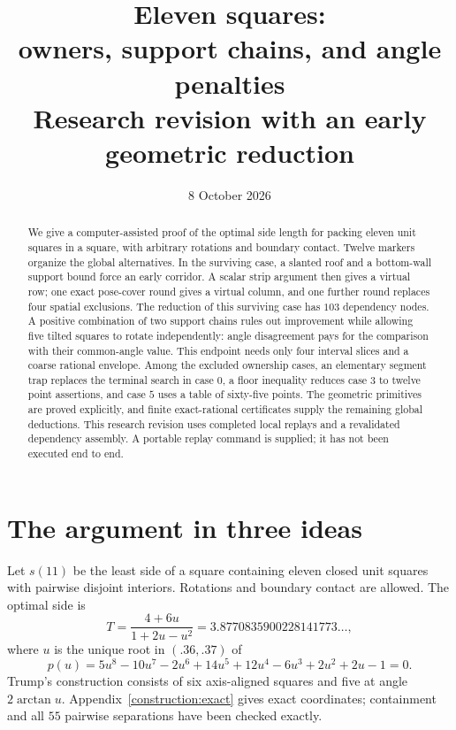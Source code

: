 \documentclass[11pt]{article}
\title{\textcolor{ink}{Eleven squares:\\owners, support chains, and angle penalties}\\[5pt]
\large Research revision with an early geometric reduction}
\author{}
\date{8 October 2026}
\begin{document}
\maketitle
\vspace{-1.5em}
\begin{abstract}
We give a computer-assisted proof of the optimal side length for packing
eleven unit squares in a square, with arbitrary rotations and boundary
contact. Twelve markers organize the global alternatives. In the surviving
case, a slanted roof and a bottom-wall support bound force an early
corridor. A scalar strip argument then gives a virtual row; one exact
pose-cover round gives a virtual column, and one further round replaces
four spatial exclusions. The reduction of this surviving case has $103$
dependency nodes. A positive combination of two support chains rules out improvement
while allowing five tilted squares to rotate independently: angle
disagreement pays for the comparison with their common-angle value.
This endpoint needs only four interval slices and a coarse rational envelope.
Among the excluded ownership cases, an elementary segment trap replaces
the terminal search in case $0$, a floor inequality reduces case $3$ to
twelve point assertions, and case $5$ uses a table of sixty-five points.
The geometric primitives are proved explicitly, and finite exact-rational
certificates supply the remaining global deductions. This research revision
uses completed local replays and a revalidated dependency assembly. A
portable replay command is supplied; it has not been executed end to end.
\end{abstract}

\section{The argument in three ideas}
Let $s(11)$ be the least side of a square containing eleven closed unit
squares with pairwise disjoint interiors. Rotations and boundary contact
are allowed. The optimal side is
\begin{equation}\label{eq:T}
 T=\frac{4+6u}{1+2u-u^2}=3.8770835900228141773\ldots,
\end{equation}
where $u$ is the unique root in $(.36,.37)$ of
\[
 p(u)=5u^8-10u^7-2u^6+14u^5+12u^4-6u^3+2u^2+2u-1=0.
\]
Trump's construction consists of six axis-aligned squares and five at angle
$2\arctan u$. Appendix~\ref{construction:exact} gives exact coordinates;
containment and all $55$ pairwise separations have been checked exactly.
\end{document}
